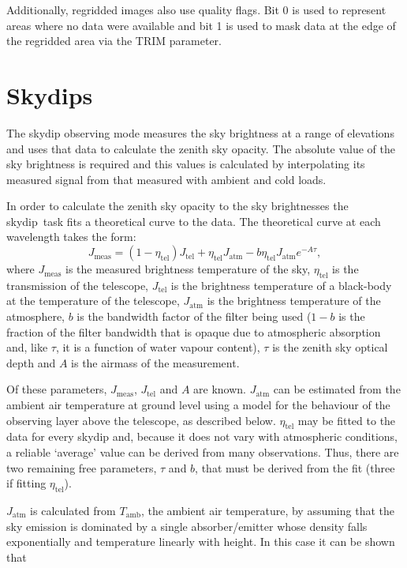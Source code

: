 \documentclass[twoside,11pt]{article}
\newcommand{\task}[1]{{\sf #1}}
\newcommand{\skydip}{\htmlref{\task{skydip}}{SKYDIP}}
\newcommand{\htmlref}[2]{#1}
\newcommand{\xlabel}[1]{}
\renewcommand{\_}{\texttt{\symbol{95}}}
\begin{document}
Additionally, regridded images also use quality flags. Bit 0 is used
to represent areas where no data were available and bit 1 is used to mask
data at the edge of the regridded area via the TRIM parameter.

\section{\xlabel{skydips}Skydips\label{skydips}}

The skydip observing mode measures the sky brightness at a range of elevations
and uses that data to calculate the zenith sky opacity. The absolute 
value of the sky brightness is required and this values 
is calculated by interpolating its measured signal from that measured with
ambient and cold loads.

In order to calculate the zenith sky opacity to the sky brightnesses
the \skydip\ task fits a theoretical curve to the data. The theoretical
curve at each wavelength takes the form:
\begin{equation}
J_\mathrm{meas} = (1 - \eta_\mathrm{tel}) J_\mathrm{tel} +
                   \eta_\mathrm{tel} J_\mathrm{atm} -
                   b  \eta_\mathrm{tel} J_\mathrm{atm} e^{-A\tau},
\end{equation}
where $J_\mathrm{meas}$ is the measured brightness temperature of the 
sky, $\eta_\mathrm{tel}$ is the transmission of the telescope, 
$J_\mathrm{tel}$ is the brightness temperature of a black-body at the
temperature of the telescope, $J_\mathrm{atm}$ is the brightness 
temperature of the atmosphere, $b$ is the bandwidth factor of the filter 
being used ($1-b$ is the fraction of the filter bandwidth that is opaque
due to atmospheric absorption and, like $\tau$, it is a function of water
vapour content), $\tau$ is the zenith sky optical depth and $A$ is the
airmass of the measurement.

Of these parameters, $J_\mathrm{meas}$, $J_\mathrm{tel}$  and $A$ are known.
$J_\mathrm{atm}$ can be estimated from the ambient air temperature at ground
level using a model for the behaviour of the observing layer above the
telescope, as described below. $\eta_\mathrm{tel}$ may be fitted to the data
for every skydip and, because it does not vary with atmospheric conditions, a
reliable `average' value can be derived from many observations. Thus, there
are two remaining free parameters, $\tau$ and $b$, that must be derived
from the fit (three if fitting $\eta_\mathrm{tel}$).

$J_\mathrm{atm}$ is calculated from $T_\mathrm{amb}$, the ambient air
temperature, by assuming that the sky emission is dominated by a single
absorber/emitter whose density falls exponentially and temperature linearly
with height. In this case it can be shown that
\end{document}
